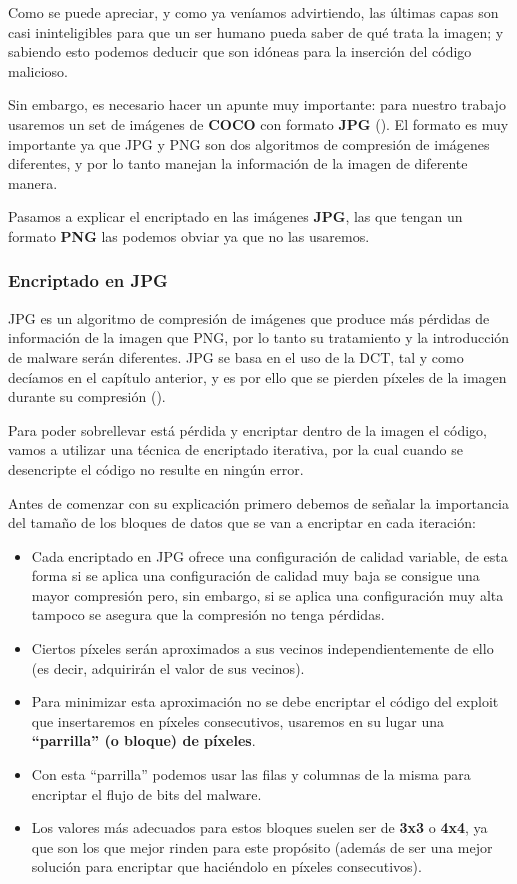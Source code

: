 
Como se puede apreciar, y como ya veníamos advirtiendo, las últimas capas son casi ininteligibles para que un ser humano pueda saber de qué trata la imagen; y sabiendo esto podemos deducir que son idóneas para la inserción del código malicioso.

Sin embargo, es necesario hacer un apunte muy importante: para nuestro trabajo usaremos un set de imágenes de \textbf{COCO} con formato \textbf{JPG} (\cite{coco}). El formato es muy importante ya que JPG y PNG son dos algoritmos de compresión de imágenes diferentes, y por lo tanto manejan la información de la imagen de diferente manera. %

Pasamos a explicar el encriptado en las imágenes \textbf{JPG}, las que tengan un formato \textbf{PNG} las podemos obviar ya que no las usaremos.

\subsubsection{Encriptado en JPG}

JPG es un algoritmo de compresión de imágenes que produce más pérdidas de información de la imagen que PNG, por lo tanto su tratamiento y la introducción de malware serán diferentes. JPG se basa en el uso de la \ac{DCT}, tal y como decíamos en el capítulo anterior, y es por ello que se pierden píxeles de la imagen durante su compresión (\cite{dct}). %

Para poder sobrellevar está pérdida y encriptar dentro de la imagen el código, vamos a utilizar una técnica de encriptado iterativa, por la cual cuando se desencripte el código no resulte en ningún error.

Antes de comenzar con su explicación primero debemos de señalar la importancia del tamaño de los bloques de datos que se van a encriptar en cada iteración: 

\begin{itemize}
\item Cada encriptado en JPG ofrece una configuración de calidad variable, de esta forma si se aplica una configuración de calidad muy baja se consigue una mayor compresión pero, sin embargo, si se aplica una configuración muy alta tampoco se asegura que la compresión no tenga pérdidas.
\item Ciertos píxeles serán aproximados a sus vecinos independientemente de ello (es decir, adquirirán el valor de sus vecinos).
\item Para minimizar esta aproximación no se debe encriptar el código del exploit que insertaremos en píxeles consecutivos, usaremos en su lugar una \textbf{``parrilla'' (o bloque) de píxeles}.
\item Con esta ``parrilla'' podemos usar las filas y columnas de la misma para encriptar el flujo de bits del malware.
\item Los valores más adecuados para estos bloques suelen ser de \textbf{3x3} o \textbf{4x4}, ya que son los que mejor rinden para este propósito (además de ser una mejor solución para encriptar que haciéndolo en píxeles consecutivos).
\end{itemize}

